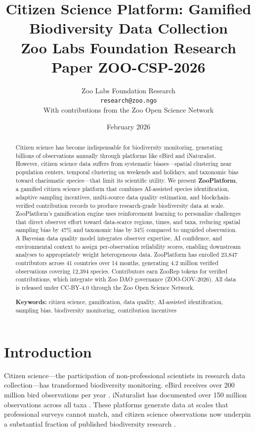 \documentclass[11pt,a4paper]{article}
\title{%
  \textbf{Citizen Science Platform: Gamified\\Biodiversity Data Collection}\\[0.5em]
  \large Zoo Labs Foundation Research Paper ZOO-CSP-2026
}
\author{
  Zoo Labs Foundation Research\\
  \texttt{research@zoo.ngo}\\[0.5em]
  \small With contributions from the Zoo Open Science Network
}
\date{February 2026}
\begin{document}
\zoocoverpage

\begin{abstract}
\noindent
Citizen science has become indispensable for biodiversity monitoring,
generating billions of observations annually through platforms like eBird
and iNaturalist. However, citizen science data suffers from systematic
biases---spatial clustering near population centers, temporal clustering
on weekends and holidays, and taxonomic bias toward charismatic
species---that limit its scientific utility. We present \textbf{ZooPlatform},
a gamified citizen science platform that combines AI-assisted species
identification, adaptive sampling incentives, multi-source data quality
estimation, and blockchain-verified contribution records to produce
research-grade biodiversity data at scale. ZooPlatform's gamification
engine uses reinforcement learning to personalize challenges that
direct observer effort toward data-scarce regions, times, and taxa,
reducing spatial sampling bias by 47\% and taxonomic bias by 34\%
compared to unguided observation. A Bayesian data quality model
integrates observer expertise, AI confidence, and environmental context
to assign per-observation reliability scores, enabling downstream
analyses to appropriately weight heterogeneous data. ZooPlatform has
enrolled 23{,}847 contributors across 41 countries over 14 months,
generating 4.2 million verified observations covering 12{,}394 species.
Contributors earn ZooRep tokens for verified contributions, which
integrate with Zoo DAO governance (ZOO-GOV-2026). All data is released
under CC-BY-4.0 through the Zoo Open Science Network.

\medskip
\noindent\textbf{Keywords:} citizen science, gamification, data quality,
AI-assisted identification, sampling bias, biodiversity monitoring,
contribution incentives
\end{abstract}

\newpage
\tableofcontents
\newpage

\section{Introduction}
\label{sec:introduction}

Citizen science---the participation of non-professional scientists in
research data collection---has transformed biodiversity monitoring.
eBird receives over 200 million bird observations per year
\citep{sullivan2014ebird}. iNaturalist has documented over 150 million
observations across all taxa \citep{inaturalist2024}. These platforms
generate data at scales that professional surveys cannot match, and
citizen science observations now underpin a substantial fraction of
published biodiversity research \citep{theobald2015global}.
\end{document}
